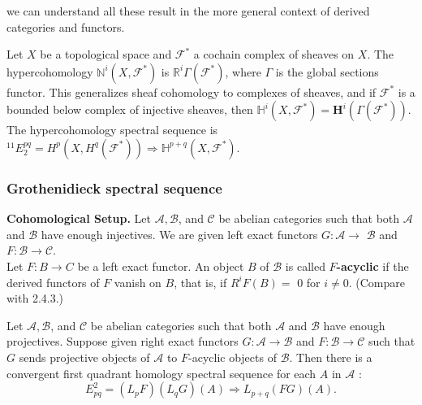 \begin{example}
we can understand all these result in the more general context of derived categories and functors.\\

\begin{example} 
Let $X$ be a topological space and $\mathcal{F}^*$ a cochain complex of sheaves on $X$. The hypercohomology $\mathbb{N}^i\left(X, \mathcal{F}^*\right)$ is $\mathbb{R}^i \Gamma\left(\mathcal{F}^*\right)$, where $\Gamma$ is the global sections functor. This generalizes sheaf cohomology to complexes of sheaves, and if $\mathcal{F}^*$ is a bounded below complex of injective sheaves, then $\mathbb{H}^i\left(X, \mathcal{F}^*\right)=\boldsymbol{H}^i\left(\Gamma\left(\mathcal{F}^*\right)\right)$. The hypercohomology spectral sequence is ${ }^{11} E_2^{p q}=H^p\left(X, H^q\left(\mathcal{F}^*\right)\right) \Rightarrow \mathbb{H}^{p+q}\left(X, \mathcal{F}^*\right)$.
\end{example}    

\subsubsection*{Grothenidieck spectral sequence}

\textbf{Cohomological Setup.} Let $\mathcal{A}, \mathcal{B}$, and $\mathcal{C}$ be abelian categories such that both $\mathcal{A}$ and $\mathcal{B}$ have enough injectives. We are given left exact functors $G: \mathcal{A} \rightarrow$ $\mathcal{B}$ and $F: \mathcal{B} \rightarrow \mathcal{C}$.\\

Let $F: B \rightarrow C$ be a left exact functor. An object $B$ of $\mathcal{B}$ is called \textbf{$F$-acyclic} if the derived functors of $F$ vanish on $B$, that is, if $R^i F(B)=$ 0 for $i \neq 0$. (Compare with 2.4.3.)

\begin{theo}
Let $\mathcal{A}, \mathcal{B}$, and $\mathcal{C}$ be abelian categories such that both $\mathcal{A}$ and $\mathcal{B}$ have enough projectives. Suppose given right exact functors $G: \mathcal{A} \rightarrow \mathcal{B}$ and $F: \mathcal{B} \rightarrow \mathcal{C}$ such that $G$ sends projective objects of $\mathcal{A}$ to $F$-acyclic objects of $\mathcal{B}$. Then there is a convergent first quadrant homology spectral sequence for each $A$ in $\mathcal{A}$ :
    $$
    E_{p q}^2=\left(L_p F\right)\left(L_q G\right)(A) \Rightarrow L_{p+q}(F G)(A) .
    $$
    

\end{theo}
\end{example}

